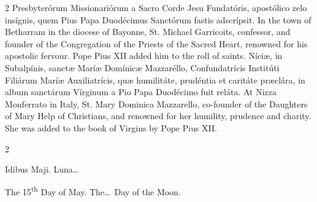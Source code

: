 \begin{paracol}{2}
 Presbyterórum Missionariórum a Sacro Corde Jesu Fundatóris, apostólico zelo 
 insígnis, quem Pius Papa Duodécimus Sanctórum fastis adscrípsit.
\switchcolumn
{}
In the town of Betharram in the 
 diocese of Bayonne, St. Michael Garricoits, confessor, and founder of the 
 Congregation of the Priests of the Sacred Heart, renowned for his apostolic 
 fervour. Pope Pius XII added him to the roll of saints.
\switchcolumn*
{}
Níciæ, in Subalpínis, 
 sanctæ Maríæ Domínicæ Mazzaréllo, Confundatrícis Institúti Filiárum Maríæ 
 Auxiliatrícis, quæ humilitáte, prudéntia et caritáte præclára, in album 
 sanctárum Vírginum a Pio Papa Duodécimo fuit reláta.
\switchcolumn
{}
At Nizza Monferrato in Italy, St. 
 Mary Dominica Mazzarello, co-founder of the Daughters of Mary Help of 
 Christians, and renowned for her humility, prudence and charity. She 
 was added to the book of Virgins by Pope Pius XII.
\switchcolumn*
{}
\end{paracol}


\begin{paracol}{2}
\begin{center}{\color{gregoriocolor} Idibus Maji. 
 Luna\dots\ }\end{center}
\switchcolumn
{}
\begin{center}{\color{gregoriocolor} The 
 15\textsuperscript{th} Day of May. The\dots\ Day of the Moon.}\end{center}
\end{paracol}

